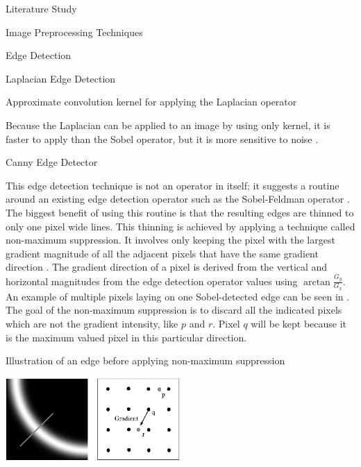 \documentclass{matthijs}
\begin{document}
\begin{hoofdstuk}{Literature Study}
\begin{paragraaf}{Image Preprocessing Techniques}
\begin{subparagraaf}{Edge Detection}
\begin{subsubparagraaf}{Laplacian Edge Detection}
\begin{figuur}{Approximate convolution kernel for applying the Laplacian operator}
						\cite{tai2008fast}
					\end{figuur}

					Because the Laplacian can be applied to an image by using only kernel, it is faster to apply than the Sobel operator, but it is more sensitive to noise \cite{sinha2017sobel}.
				\end{subsubparagraaf}

				\begin{subsubparagraaf}{Canny Edge Detector}

					This edge detection technique is not an operator in itself; it suggests a routine around an existing edge detection operator such as the Sobel-Feldman operator \cite{canny1986computational}.
					The biggest benefit of using this routine is that the resulting edges are thinned to only one pixel wide lines.
					This thinning is achieved by applying a technique called non-maximum suppression.
					It involves only keeping the pixel with the largest gradient magnitude of all the adjacent pixels that have the same gradient direction \cite{sarab2020canny}.
					The gradient direction of a pixel is derived from the vertical and horizontal magnitudes from the edge detection operator values using $\arctan \frac{G_y}{G_x}$.
					An example of multiple pixels laying on one Sobel-detected edge can be seen in .
					The goal of the non-maximum suppression is to discard all the indicated pixels which are not the gradient intensity, like $p$ and $r$.
					Pixel $q$ will be kept because it is the maximum valued pixel in this particular direction.
					
					\begin{figuur}{Illustration of an edge before applying non-maximum suppression}

						\includegraphics[width=0.5\textwidth]{teli2019canny-img1.png}
						\cite{teli2019canny}

					\end{figuur}


\end{subsubparagraaf}
\end{subparagraaf}
\end{paragraaf}
\end{hoofdstuk}
\end{document}
